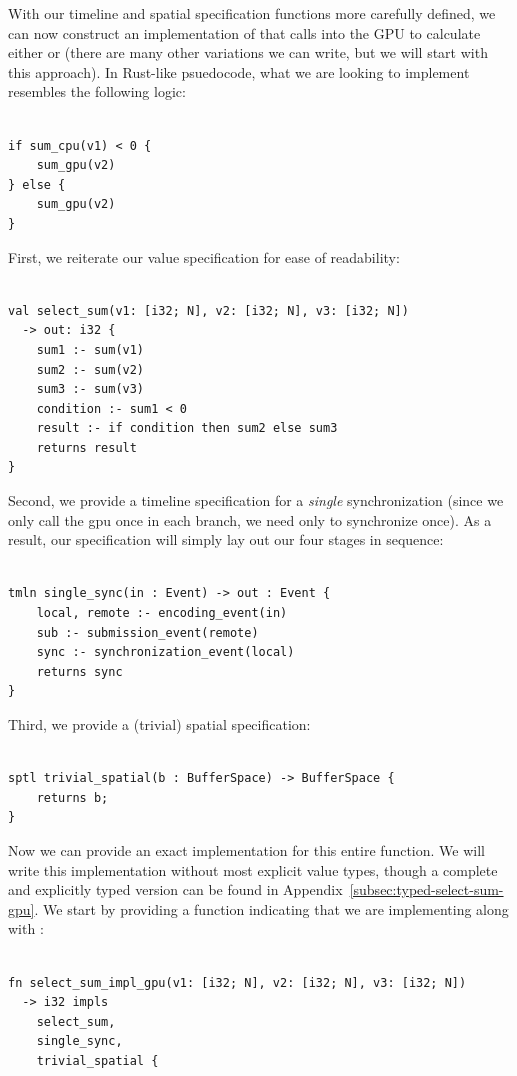 With our timeline and spatial specification functions more carefully defined, we can now construct an implementation of  that calls into the GPU to calculate either  or  (there are many other variations we can write, but we will start with this approach).  In Rust-like psuedocode, what we are looking to implement resembles the following logic:
%
\begin{lstlisting}

if sum_cpu(v1) < 0 {
    sum_gpu(v2)
} else {
    sum_gpu(v2)
}
\end{lstlisting}
%
First, we reiterate our value specification for ease of readability:
%
\begin{lstlisting}

val select_sum(v1: [i32; N], v2: [i32; N], v3: [i32; N]) 
  -> out: i32 {
    sum1 :- sum(v1)
    sum2 :- sum(v2)
    sum3 :- sum(v3)
    condition :- sum1 < 0
    result :- if condition then sum2 else sum3
    returns result
}
\end{lstlisting}
%
Second, we provide a timeline specification for a \emph{single} synchronization (since we only call the gpu once in each branch, we need only to synchronize once).  As a result, our specification will simply lay out our four stages in sequence:
%
\begin{lstlisting}

tmln single_sync(in : Event) -> out : Event {
    local, remote :- encoding_event(in)
    sub :- submission_event(remote)
    sync :- synchronization_event(local)
    returns sync
}
\end{lstlisting}
%
Third, we provide a (trivial) spatial specification:
%
\begin{lstlisting}

sptl trivial_spatial(b : BufferSpace) -> BufferSpace {
    returns b;
}
\end{lstlisting}
%
Now we can provide an exact implementation for this entire function.  We will write this implementation without most explicit value types, though a complete and explicitly typed version can be found in Appendix~\ref{subsec:typed-select-sum-gpu}.  We start by providing a function indicating that we are implementing  along with :
%
\begin{lstlisting}

fn select_sum_impl_gpu(v1: [i32; N], v2: [i32; N], v3: [i32; N]) 
  -> i32 impls 
  	select_sum,
	single_sync,
	trivial_spatial {
\end{lstlisting}
